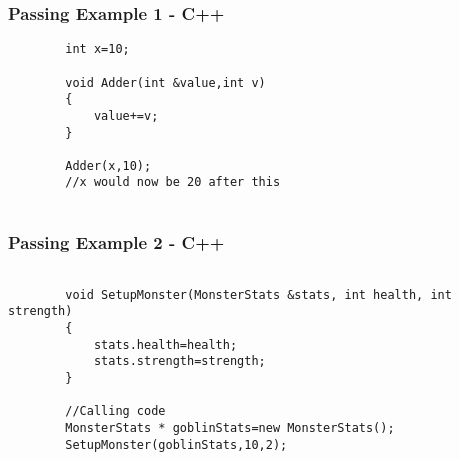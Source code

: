 \begin{frame}[fragile]
\frametitle{Passing Example 1 - C++}
	\begin{lstlisting}
		int x=10;
	
		void Adder(int &value,int v)
		{
			value+=v;	
		}
	
		Adder(x,10);
		//x would now be 20 after this		
	
	\end{lstlisting}
\end{frame}

\begin{frame}[fragile]
\frametitle{Passing Example 2 - C++}
	\begin{lstlisting}
	
		void SetupMonster(MonsterStats &stats, int health, int strength)
		{
			stats.health=health;
			stats.strength=strength;
		}
		
		//Calling code
		MonsterStats * goblinStats=new MonsterStats();
		SetupMonster(goblinStats,10,2);
	\end{lstlisting}
\end{frame}

